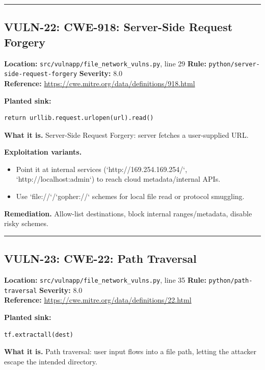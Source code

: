 \documentclass[11pt,a4paper]{article}
\begin{document}
\vspace{4pt}\hrule\vspace{6pt}
\subsection{VULN-22: CWE-918: Server-Side Request Forgery}
\noindent\textbf{Location:} \texttt{src/vulnapp/file\_network\_vulns.py}, line 29 \quad \textbf{Rule:} \texttt{python/server-side-request-forgery} \quad \textbf{Severity:} 8.0
\\ \textbf{Reference:} \url{https://cwe.mitre.org/data/definitions/918.html}

\noindent\textbf{Planted sink:}
\begin{lstlisting}
return urllib.request.urlopen(url).read()
\end{lstlisting}
\noindent\textbf{What it is.} Server-Side Request Forgery: server fetches a user-supplied URL.

\noindent\textbf{Exploitation variants.}
\begin{itemize}[leftmargin=1.4em,itemsep=1pt,topsep=2pt]
\item Point it at internal services (`http://169.254.169.254/`, `http://localhost:admin`) to reach cloud metadata/internal APIs.
\item Use `file://`/`gopher://` schemes for local file read or protocol smuggling.
\end{itemize}
\noindent\textbf{Remediation.} Allow-list destinations, block internal ranges/metadata, disable risky schemes.

\vspace{4pt}\hrule\vspace{6pt}
\subsection{VULN-23: CWE-22: Path Traversal}
\noindent\textbf{Location:} \texttt{src/vulnapp/file\_network\_vulns.py}, line 35 \quad \textbf{Rule:} \texttt{python/path-traversal} \quad \textbf{Severity:} 8.0
\\ \textbf{Reference:} \url{https://cwe.mitre.org/data/definitions/22.html}

\noindent\textbf{Planted sink:}
\begin{lstlisting}
tf.extractall(dest)
\end{lstlisting}
\noindent\textbf{What it is.} Path traversal: user input flows into a file path, letting the attacker escape the intended directory.
\end{document}
